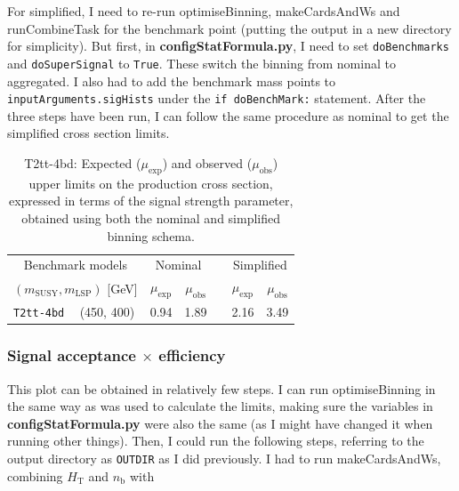 For simplified, I need to re-run optimiseBinning, makeCardsAndWs and runCombineTask for the benchmark point (putting the output in a new directory for simplicity). But first, in \textbf{configStatFormula.py}, I need to set \texttt{doBenchmarks}  and \texttt{doSuperSignal} to \texttt{True}. These switch the binning from nominal to aggregated. I also had to add the benchmark mass points to \texttt{inputArguments.sigHists} under the \texttt{if doBenchMark:} statement. After the three steps have been run, I can follow the same procedure as nominal to get the simplified cross section limits.

\begin{table}[H]
  \centering
  \begin{tabular}{ llccccc }
    \hline
    \multicolumn{2}{c}{Benchmark models}    & \multicolumn{2}{c}{Nominal}
                                            &
                                            & \multicolumn{2}{c}{Simplified}             \\ [0.3ex]
    \cline{3-4}
    \cline{6-7}
    \multicolumn{2}{c}{$(m_{\text{SUSY}}, m_{\mathrm{LSP}})$ [GeV]}
                                            & $\mu_{\text{exp}}$
                                            & $\mu_{\text{obs}}$
                                            &
                                            & $\mu_{\text{exp}}$
                                            & $\mu_{\text{obs}}$                         \\ [0.3ex]
    \hline
    \texttt{T2tt-4bd} & (450, 400) & 0.94 & 1.89 & & 2.16 & 3.49 \\
        \hline
  \end{tabular}
  \caption{T2tt-4bd: Expected ($\mu_{\mathrm{exp}}$) and observed ($\mu_{\mathrm{obs}}$) upper limits on the production cross section, expressed in terms of the signal strength parameter, obtained using both the nominal and simplified binning schema.}
\end{table}

    
\subsubsection{Signal acceptance \texorpdfstring{$\times$}{x} efficiency}

This plot can be obtained in relatively few steps. I can run optimiseBinning in the same way as was used to calculate the limits, making sure the variables in \textbf{configStatFormula.py} were also the same (as I might have changed it when running other things). Then, I could run the following steps, referring to the output directory as \texttt{OUTDIR} as I did previously. I had to run makeCardsAndWs, combining $H_{\mathrm{T}}$ and $n_{\mathrm{b}}$ with

